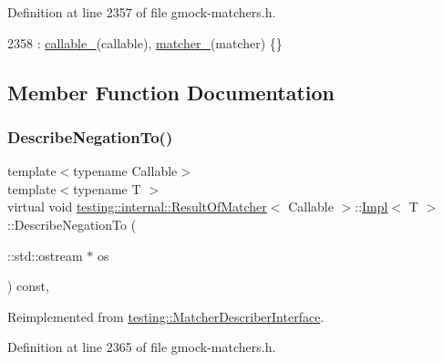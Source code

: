 Definition at line 2357 of file gmock-\/matchers.\+h.


\begin{DoxyCode}
2358         : \hyperlink{classtesting_1_1internal_1_1ResultOfMatcher_1_1Impl_a4020b7c533f4cb147abd5af081308e37}{callable\_}(callable), \hyperlink{classtesting_1_1internal_1_1ResultOfMatcher_1_1Impl_a2ce504e44dae05b5e574e21def4f1cba}{matcher\_}(matcher) \{\}
\end{DoxyCode}


\subsection{Member Function Documentation}
\mbox{\label{classtesting_1_1internal_1_1ResultOfMatcher_1_1Impl_a0cce532e88284a2939fc6b63cadc51a6}} 
\subsubsection{\texorpdfstring{Describe\+Negation\+To()}{DescribeNegationTo()}}
{\footnotesize\ttfamily template$<$typename Callable$>$ \\
template$<$typename T $>$ \\
virtual void \hyperlink{classtesting_1_1internal_1_1ResultOfMatcher}{testing\+::internal\+::\+Result\+Of\+Matcher}$<$ Callable $>$\+::\hyperlink{classtesting_1_1internal_1_1ResultOfMatcher_1_1Impl}{Impl}$<$ T $>$\+::Describe\+Negation\+To (\begin{DoxyParamCaption}\item[{\+::std\+::ostream $\ast$}]{os }\end{DoxyParamCaption}) const\hspace{0.3cm}{\ttfamily [inline]}, {\ttfamily [virtual]}}



Reimplemented from \hyperlink{classtesting_1_1MatcherDescriberInterface_a2071afbc47097c4d1c0064275af34db0}{testing\+::\+Matcher\+Describer\+Interface}.



Definition at line 2365 of file gmock-\/matchers.\+h.


